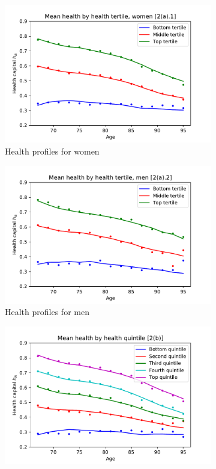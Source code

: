 \documentclass[12pt,pdftex,letterpaper]{article}
\begin{document}
\begin{figure}[h!]
    \centering
    \begin{subfigure}[b]{0.49\textwidth}
        \centering
        \includegraphics[width=\textwidth]{../Figures/HealthByHealthAgeWomen.pdf}
        \caption{Health profiles for women}
    \end{subfigure}
    \begin{subfigure}[b]{0.49\textwidth}
        \centering
        \includegraphics[width=\textwidth]{../Figures/HealthByHealthAgeMen.pdf}
        \caption{Health profiles for men}
    \end{subfigure}
    \begin{subfigure}[b]{0.49\textwidth}
        \centering
        \includegraphics[width=\textwidth]{../Figures/HealthByHealthAge.pdf}

\end{subfigure}
\end{figure}
\end{document}

